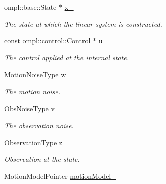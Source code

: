 \begin{DoxyCompactItemize}
\item 
\hypertarget{class_linear_system_a0c0d8d1a986bd267171d8c821e173d1e}{ompl\-::base\-::\-State $\ast$ \hyperlink{class_linear_system_a0c0d8d1a986bd267171d8c821e173d1e}{x\-\_\-}}\label{class_linear_system_a0c0d8d1a986bd267171d8c821e173d1e}

\begin{DoxyCompactList}\small\item\em \-The state at which the linear system is constructed. \end{DoxyCompactList}\item 
\hypertarget{class_linear_system_a5b5cb60bca40f61e6b4a6ac3afe56115}{const ompl\-::control\-::\-Control $\ast$ \hyperlink{class_linear_system_a5b5cb60bca40f61e6b4a6ac3afe56115}{u\-\_\-}}\label{class_linear_system_a5b5cb60bca40f61e6b4a6ac3afe56115}

\begin{DoxyCompactList}\small\item\em \-The control applied at the internal state. \end{DoxyCompactList}\item 
\hypertarget{class_linear_system_ab3909105492e1b8f55919584d9f99a03}{\-Motion\-Noise\-Type \hyperlink{class_linear_system_ab3909105492e1b8f55919584d9f99a03}{w\-\_\-}}\label{class_linear_system_ab3909105492e1b8f55919584d9f99a03}

\begin{DoxyCompactList}\small\item\em \-The motion noise. \end{DoxyCompactList}\item 
\hypertarget{class_linear_system_a41f05f9ef0c2e5e69a0b0c2d50d983bb}{\-Obs\-Noise\-Type \hyperlink{class_linear_system_a41f05f9ef0c2e5e69a0b0c2d50d983bb}{v\-\_\-}}\label{class_linear_system_a41f05f9ef0c2e5e69a0b0c2d50d983bb}

\begin{DoxyCompactList}\small\item\em \-The observation noise. \end{DoxyCompactList}\item 
\hypertarget{class_linear_system_a8d402083ec5c55357a11ec8e780bcf20}{\-Observation\-Type \hyperlink{class_linear_system_a8d402083ec5c55357a11ec8e780bcf20}{z\-\_\-}}\label{class_linear_system_a8d402083ec5c55357a11ec8e780bcf20}

\begin{DoxyCompactList}\small\item\em \-Observation at the state. \end{DoxyCompactList}\item 
\hypertarget{class_linear_system_a6ae00f368bfa21a8dfe0d6855bfc1322}{\-Motion\-Model\-Pointer \hyperlink{class_linear_system_a6ae00f368bfa21a8dfe0d6855bfc1322}{motion\-Model\-\_\-}}\label{class_linear_system_a6ae00f368bfa21a8dfe0d6855bfc1322}


\end{DoxyCompactItemize}
